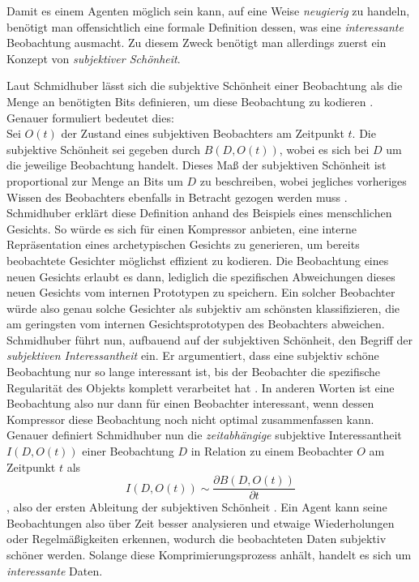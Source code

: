 Damit es einem Agenten möglich sein kann, auf eine Weise \emph{neugierig} zu handeln, benötigt man offensichtlich eine formale Definition dessen, was eine \emph{interessante} Beobachtung ausmacht. Zu diesem Zweck benötigt man allerdings zuerst ein Konzept von \emph{subjektiver Schönheit}.

Laut Schmidhuber lässt sich die subjektive Schönheit einer Beobachtung als die Menge an benötigten Bits definieren, um diese Beobachtung zu kodieren \cite[p.~7]{curiosity_schmidhuber}.
Genauer formuliert bedeutet dies: \\
Sei \(O(t)\) der Zustand eines subjektiven Beobachters am Zeitpunkt \(t\). 
Die subjektive Schönheit sei gegeben durch \(B(D,O(t))\), wobei es sich bei \(D\) um die jeweilige Beobachtung handelt.
Dieses Maß der subjektiven Schönheit ist proportional zur Menge an Bits um \(D\) zu beschreiben, wobei jegliches vorheriges Wissen des Beobachters ebenfalls in Betracht gezogen werden muss \cite[p.~7]{curiosity_schmidhuber}.
Schmidhuber erklärt diese Definition anhand des Beispiels eines menschlichen Gesichts. So würde es sich für einen Kompressor anbieten, eine interne Repräsentation eines archetypischen Gesichts zu generieren, um bereits beobachtete Gesichter möglichst effizient zu kodieren. Die Beobachtung eines neuen Gesichts erlaubt es dann, lediglich die spezifischen Abweichungen dieses neuen Gesichts vom internen Prototypen zu speichern. Ein solcher Beobachter würde also genau solche Gesichter als subjektiv am schönsten klassifizieren, die am geringsten vom internen Gesichtsprototypen des Beobachters abweichen. \cite[p.~7]{curiosity_schmidhuber} \\

Schmidhuber führt nun, aufbauend auf der subjektiven Schönheit, den Begriff der \emph{subjektiven Interessantheit} ein. 
Er argumentiert, dass eine subjektiv schöne Beobachtung nur so lange interessant ist, bis der Beobachter die spezifische Regularität des Objekts komplett verarbeitet hat \cite[p.~7-8]{curiosity_schmidhuber}. In anderen Worten ist eine Beobachtung also nur dann für einen Beobachter interessant, wenn dessen Kompressor diese Beobachtung noch nicht optimal zusammenfassen kann. \\

Genauer definiert Schmidhuber nun die \emph{zeitabhängige} subjektive Interessantheit \(I(D,O(t))\) einer Beobachtung \(D\) in Relation zu einem Beobachter \(O\) am Zeitpunkt \(t\) als 
\begin{equation}
    I(D,O(t)) \sim \frac{\partial B(D,O(t))}{\partial t}
\end{equation}
, also der ersten Ableitung der subjektiven Schönheit \cite[p.~8]{curiosity_schmidhuber}.
Ein Agent kann seine Beobachtungen also über Zeit besser analysieren und etwaige Wiederholungen oder Regelmäßigkeiten erkennen, wodurch die beobachteten Daten subjektiv schöner werden. Solange diese Komprimierungsprozess anhält, handelt es sich um \emph{interessante} Daten. \cite[p.~8]{curiosity_schmidhuber}


